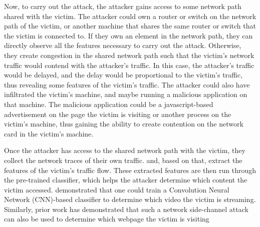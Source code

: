Now, to carry out the attack, the attacker gains access to some network path shared with the victim.
The attacker could own a router or switch on the network path of the victim, or another machine that shares the same router or switch that the victim is connected to.
If they own an element in the network path, they can directly observe all the features necessary to carry out the attack. 
Otherwise, they create congestion in the shared network path such that the victim's network traffic would contend with the attacker's traffic.
In this case, the attacker's traffic would be delayed, and the delay would be proportional to the victim's traffic, thus revealing some features of the victim's traffic.
The attacker could also have infiltrated the victim's machine, and maybe running a malicious application on that machine.
The malicious application could be a javascript-based advertisement on the page the victim is visiting or another process on the victim's machine, thus gaining the ability to create contention on the network card in the victim's machine. 


Once the attacker has access to the shared network path with the victim, they collect the network traces of their own traffic. and, based on that, extract the features of the victim's traffic flow.
These extracted features are then run through the pre-trained classifier, which helps the attacker determine which content the victim accessed. 
\citet{schuster2017beautyburst} demonstrated that one could train a Convolution Neural Network (CNN)-based classifier to determine which video the victim is streaming.
Similarly, prior work has demonstrated that such a network side-channel attack can also be used to determine which webpage the victim is visiting \cite{hayes2016kfp, panchenko2016website, gong2010fingerprinting}

